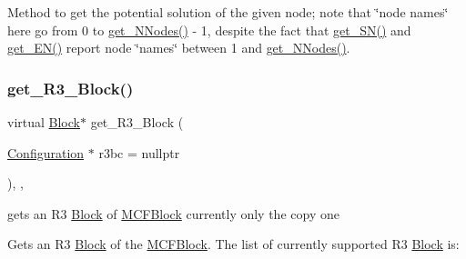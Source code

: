 Method to get the potential solution of the given node; note that \char`\"{}node
names\char`\"{} here go from 0 to \mbox{\hyperlink{class_s_m_spp__di__unipi__it_1_1_m_c_f_block_afff9080606a5612d33ba20c39d663839}{get\+\_\+\+N\+Nodes()}} -\/ 1, despite the fact that \mbox{\hyperlink{class_s_m_spp__di__unipi__it_1_1_m_c_f_block_a48ce277b5dac05d54aa2281fa4595c7b}{get\+\_\+\+S\+N()}} and \mbox{\hyperlink{class_s_m_spp__di__unipi__it_1_1_m_c_f_block_a34619412f7c801aadfa0b083a6efda36}{get\+\_\+\+E\+N()}} report node \char`\"{}names\char`\"{} between 1 and \mbox{\hyperlink{class_s_m_spp__di__unipi__it_1_1_m_c_f_block_afff9080606a5612d33ba20c39d663839}{get\+\_\+\+N\+Nodes()}}. \mbox{\label{class_s_m_spp__di__unipi__it_1_1_m_c_f_block_a36fbb6f247e14792e84f68e801c49783}} 
\subsubsection{\texorpdfstring{get\+\_\+\+R3\+\_\+\+Block()}{get\_R3\_Block()}}
{\footnotesize\ttfamily virtual \mbox{\hyperlink{class_s_m_spp__di__unipi__it_1_1_block}{Block}}$\ast$ get\+\_\+\+R3\+\_\+\+Block (\begin{DoxyParamCaption}\item[{\mbox{\hyperlink{class_s_m_spp__di__unipi__it_1_1_configuration}{Configuration}} $\ast$}]{r3bc = {\ttfamily nullptr} }\end{DoxyParamCaption})\hspace{0.3cm}{\ttfamily [final]}, {\ttfamily [override]}, {\ttfamily [virtual]}}



gets an R3 \mbox{\hyperlink{class_s_m_spp__di__unipi__it_1_1_block}{Block}} of \mbox{\hyperlink{class_s_m_spp__di__unipi__it_1_1_m_c_f_block}{M\+C\+F\+Block}} currently only the copy one 

Gets an R3 \mbox{\hyperlink{class_s_m_spp__di__unipi__it_1_1_block}{Block}} of the \mbox{\hyperlink{class_s_m_spp__di__unipi__it_1_1_m_c_f_block}{M\+C\+F\+Block}}. The list of currently supported R3 \mbox{\hyperlink{class_s_m_spp__di__unipi__it_1_1_block}{Block}} is\+:


